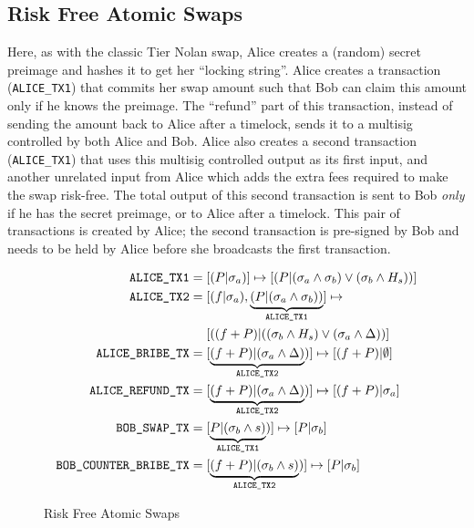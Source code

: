\subsection{Risk Free Atomic Swaps}
\label{bribing:risk_free_atomic_swap}
Here, as with the classic Tier Nolan swap, Alice creates a (random) secret preimage and hashes it to get her ``locking string''. Alice creates a transaction ({\texttt{ALICE\_TX1}}) that commits her swap amount such that Bob can claim this amount only if he knows the preimage. The ``refund'' part of this transaction, instead of sending the amount back to Alice after a timelock, sends it to a multisig controlled by both Alice and Bob. Alice also creates a second transaction ({\texttt{ALICE\_TX1}}) that uses this multisig controlled output as its first input, and another unrelated input from Alice which adds the extra fees required to make the swap risk-free. The total output of this second transaction is sent to Bob \textit{only} if he has the secret preimage, or to Alice after a timelock. This pair of transactions is created by Alice; the second transaction is pre-signed by Bob and needs to be held by Alice before she broadcasts the first transaction. 

\begin{figure}[hbt!]
    \centering
    \caption{Risk Free Atomic Swaps}
    \label{fig:risk_free_atomic_swap}
\begin{align*}
    \texttt{ALICE\_TX1} &= [(P|\sigma_a)] \mapsto [(P|(\sigma_a \land \sigma_b) \lor (\sigma_b \land H_{s}))] \\
    \texttt{ALICE\_TX2} &= [(f|\sigma_a), \underbrace{(P|(\sigma_a \land \sigma_b))}_{\texttt{ALICE\_TX1}}] \mapsto \\ 
    &\phantomrel{=} {} [((f+P)| ((\sigma_b \land H_{s}) \lor (\sigma_a \land \Delta))]\\ 
    \texttt{ALICE\_BRIBE\_TX} &= [\underbrace{(f+P)|(\sigma_a \land \Delta)}_{\texttt{ALICE\_TX2}})] \mapsto [(f+P)| \emptyset]\\  
    \texttt{ALICE\_REFUND\_TX} &= [\underbrace{(f+P)|(\sigma_a \land \Delta)}_{\texttt{ALICE\_TX2}})] \mapsto [(f+P)| \sigma_a]\\  
    \texttt{BOB\_SWAP\_TX} &= [\underbrace{P|(\sigma_b \land s)}_{\texttt{ALICE\_TX1}})] \mapsto [P| \sigma_b]\\
    \texttt{BOB\_COUNTER\_BRIBE\_TX} &= [\underbrace{(f+P)|(\sigma_b \land s)}_{\texttt{ALICE\_TX2}})] \mapsto [P| \sigma_b]\\
\end{align*}
\end{figure}

